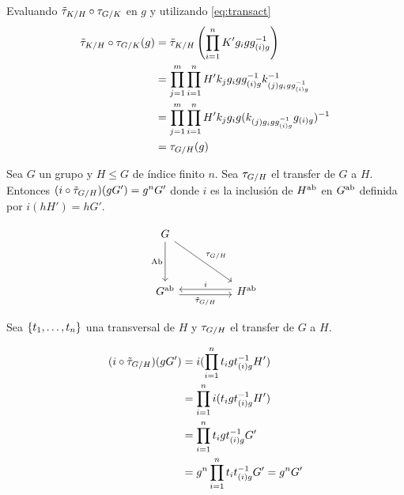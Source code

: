 \begin{proposicion}
\begin{demostracion}
		Evaluando $\tilde\tau_{K/ H} \circ \tau_{G/ K}$ en $g$ y utilizando \eqref{eq:transact}		
		\begin{align*}
		{\tilde\tau_{K/ H}} \circ {\tau_{G/ K} (g)} &= {\tilde\tau_{K/ H}}\left(\prod_{i=1}^n K' g_i g g_{(i)g}^{-1}\right) \\
			&= \prod_{j=1}^m\prod_{i=1}^n H'k_j g_i g g_{(i)g}^{-1} k_{(j)g_i g g_{(i)g}^{-1}}^{-1}  \\
			&= \prod_{j=1}^m\prod_{i=1}^n H'k_j g_i g  (k_{(j)g_i g g_{(i)g}^{-1}} g_{(i)g})^{-1} \\
			& = {\tau_{G/ H}}(g)
		\end{align*}
	\end{demostracion}
\end{proposicion}

\begin{proposicion}
	Sea $G$ un grupo y $H\leq G$ de índice finito $n$. Sea $\tau_{G/ H}$ el transfer de $G$ a $H$. Entonces $(i\circ {\tilde\tau_{G/ H}})(gG') = g^nG'$ donde $i$ es la inclusión de $H^\text{ab}$ en $G^\text{ab}$ definida por $i(hH') = hG'$.

\[\begin{tikzcd}
	G \\
	\\
	{\Ab G} && {\Ab H}
	\arrow["{\ptransfer G H}"', shift right=1, from=3-1, to=3-3]
	\arrow["i"', shift right=1, from=3-3, to=3-1]
	\arrow["{\transfer G H}", from=1-1, to=3-3]
	\arrow["\AbFunctor"', from=1-1, to=3-1]
\end{tikzcd}\]
	
	\begin{demostracion}
		Sea $\{t_1,\ldots,t_n\}$ una transversal de $H$ y $\tau_{G/ H}$ el transfer de $G$ a $H$. %
		
		\begin{align*}
		(i\circ {\tilde\tau_{G/ H}})(gG') 
		&= i(\prod_{i=1}^n  t_igt_{(i)g}^{-1}H') \\
		&= \prod_{i=1}^n  i(t_igt_{(i)g}^{-1}H') \\
		&= \prod_{i=1}^n  t_igt_{(i)g}^{-1}G' \\
		&= g^n\prod_{i=1}^n  t_it_{(i)g}^{-1}G'=g^nG'
		\end{align*}
	\end{demostracion} 
\end{proposicion}

